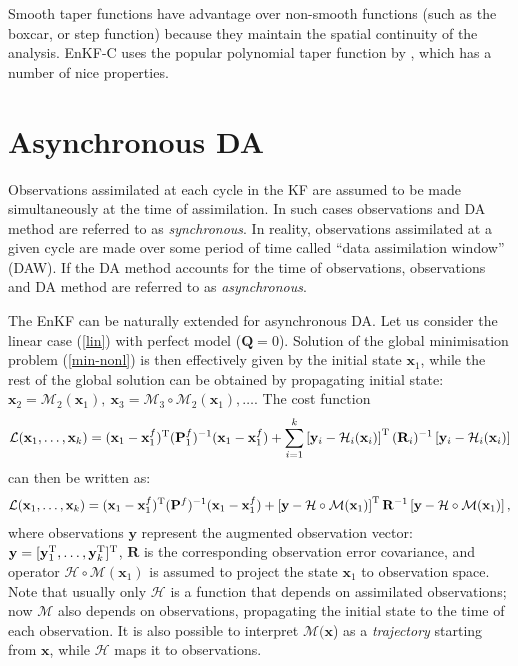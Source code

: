 \documentclass[11pt]{report}
\newcommand{\mb} {\mathbf}
\newcommand{\T}{^{\tiny \mathrm T}}
\begin{document}
Smooth taper functions have advantage over non-smooth functions (such as the boxcar, or step function) because they maintain the spatial continuity of the analysis.
EnKF-C uses the popular polynomial taper function by \citet{gas99a}, which has a number of nice properties.

\section{Asynchronous DA}

Observations assimilated at each cycle in the KF are assumed to be made simultaneously at the time of assimilation.
In such cases observations and DA method are referred to as \emph{synchronous}.
In reality, observations assimilated at a given cycle are made over some period of time called ``data assimilation window'' (DAW).
If the DA method accounts for the time of observations, observations and DA method are referred to as \emph{asynchronous}.

The EnKF can be naturally extended for asynchronous DA.
Let us consider the linear case (\ref{lin}) with perfect model ($\mb Q = 0$).
Solution of the global minimisation problem (\ref{min-nonl}) is then effectively given by the initial state $\mb x_1$, while the rest of the global solution can be obtained by propagating initial state: $\mb x_2 = \mathcal M_2(\mb x_1),\ \mb x_3 = \mathcal M_3 \circ \mathcal M_2(\mb x_1), \dots$.
The cost function
\begin{align*}
  \mathcal L(\mb x_1, \dots, \mb x_k)  = (\mb x_1 - \mb x_1^f)\T (\mb P_1^f)^{-1} (\mb x_1 - \mb x_1^f) + \sum_{i = 1}^k \left [ \mb y_i - \mathcal H_i(\mb x_i) \right ] \T (\mb R_i)^{-1} \left [ \mb y_i - \mathcal H_i(\mb x_i) \right ]
\end{align*}
can then be written as:
\begin{align}
  \label{cost-async}
  \mathcal L(\mb x_1, \dots, \mb x_k)  = (\mb x_1 - \mb x_1^f)\T (\mb P^f)^{-1} (\mb x_1 - \mb x_1^f) + \left [ \mb y - \mathcal H \circ \mathcal M(\mb x_1) \right ] \T \mb R^{-1} \left [ \mb y - \mathcal H\circ \mathcal M(\mb x_1) \right ],
\end{align}
where observations $\mb y$ represent the augmented observation vector: $\mb y = [\mb y_1\T,\dots,\mb y_k\T]\T$, $\mb R$ is the corresponding observation error covariance, and operator $\mathcal H \circ \mathcal M (\mb x_1)$ is assumed to project the state $\mb x_1$ to observation space.
Note that usually only $\mathcal H$ is a function that depends on assimilated observations; now $\mathcal M$ also depends on observations, propagating the initial state to the time of each observation.
It is also possible to interpret $\mathcal M(\mb x$) as a \emph{trajectory} starting from $\mb x$, while $\mathcal H$ maps it to observations.
\end{document}
